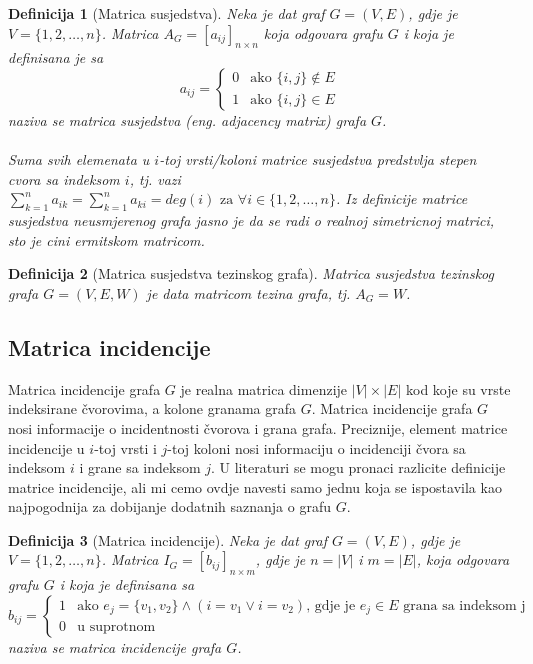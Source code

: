 \documentclass[11pt]{article}
\newtheorem{definition}{Definicija}
\begin{document}
			\begin{definition}[Matrica susjedstva] 
			Neka je dat graf $G = (V, E)$, gdje je $V = \{1, 2, \dots, n\}$. Matrica $A_G = [a_{ij}]_{n \times n}$ koja odgovara grafu $G$ i koja je definisana je sa
			 \[
				 a_{ij} =
				 \begin{cases} 
				 0 & \text{ako } \{i, j\} \notin E \\ 
				 1 & \text{ako } \{i, j\} \in E
				 \end{cases}
			 \]
			naziva se matrica susjedstva (eng. adjacency matrix) grafa $G$.
				\paragraph{}
				Suma svih elemenata u $i$-toj vrsti/koloni matrice susjedstva predstvlja stepen cvora sa indeksom $i$,
				tj. vazi $\sum_{k=1}^{n}a_{ik} = \sum_{k=1}^{n}a_{ki} = deg(i) \text{ za } \forall i \in \{1,2, \dots, n\}$.
				Iz definicije matrice susjedstva neusmjerenog grafa jasno je da se radi o realnoj simetricnoj matrici, sto je cini ermitskom matricom. 
			\end{definition}
	
			\begin{definition}[Matrica susjedstva tezinskog grafa] 
			Matrica susjedstva tezinskog grafa  $G = (V, E, W)$ je data matricom tezina grafa, tj. $A_G = W$.
			\end{definition}
	
		\subsection{Matrica incidencije}
		Matrica incidencije grafa $G$ je realna matrica dimenzije $|V| \times |E|$ kod koje su vrste indeksirane čvorovima, a kolone granama grafa $G$.
		Matrica incidencije grafa $G$ nosi informacije o incidentnosti čvorova i grana grafa. 
		Preciznije, element matrice incidencije u $i$-toj vrsti i $j$-toj koloni nosi informaciju o incidenciji čvora sa indeksom $i$ i grane sa indeksom $j$.
		U literaturi se mogu pronaci razlicite definicije matrice incidencije, ali mi cemo ovdje navesti samo jednu koja se ispostavila kao najpogodnija za dobijanje dodatnih saznanja o grafu $G$.
	
			\begin{definition}[Matrica incidencije] 
			Neka je dat graf $G = (V, E)$, gdje je $V = \{1, 2, \dots, n\}$. Matrica $I_G = [b_{ij}]_{n \times m}$, gdje je $n = |V|$ i $m = |E|$, koja odgovara grafu $G$ i koja je definisana sa
			 \[
				 b_{ij} =
				 \begin{cases}
				 1 & \text{ako } e_j = \{v_1,v_2\} \land ( i = v_1 \lor i=v_2) \text{, gdje je } e_j \in E \text{ grana sa indeksom j} \\
				 0 & \text{u suprotnom}
				 \end{cases}
			 \]
			naziva se matrica incidencije grafa $G$.
			\end{definition}
	
\end{document}
